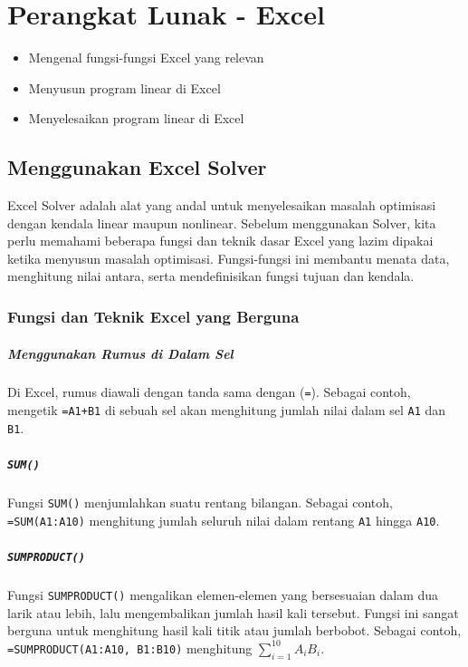 \chapter{Perangkat Lunak - Excel}

\begin{outcome}
\begin{itemize}
\item Mengenal fungsi-fungsi Excel yang relevan
\item Menyusun program linear di Excel
\item Menyelesaikan program linear di Excel
\end{itemize}
\end{outcome}

\section{Menggunakan Excel Solver}
\label{sec:excel-solver}

Excel Solver adalah alat yang andal untuk menyelesaikan masalah optimisasi dengan kendala linear maupun nonlinear. Sebelum menggunakan Solver, kita perlu memahami beberapa fungsi dan teknik dasar Excel yang lazim dipakai ketika menyusun masalah optimisasi. Fungsi-fungsi ini membantu menata data, menghitung nilai antara, serta mendefinisikan fungsi tujuan dan kendala.

\subsection{Fungsi dan Teknik Excel yang Berguna}

\paragraph{Menggunakan Rumus di Dalam Sel}
Di Excel, rumus diawali dengan tanda sama dengan (\texttt{=}). Sebagai contoh, mengetik \texttt{=A1+B1} di sebuah sel akan menghitung jumlah nilai dalam sel \texttt{A1} dan \texttt{B1}.

\paragraph{\texttt{SUM()}}
Fungsi \texttt{SUM()} menjumlahkan suatu rentang bilangan. Sebagai contoh, \texttt{=SUM(A1:A10)} menghitung jumlah seluruh nilai dalam rentang \texttt{A1} hingga \texttt{A10}.

\paragraph{\texttt{SUMPRODUCT()}}
Fungsi \texttt{SUMPRODUCT()} mengalikan elemen-elemen yang bersesuaian dalam dua larik atau lebih, lalu mengembalikan jumlah hasil kali tersebut. Fungsi ini sangat berguna untuk menghitung hasil kali titik atau jumlah berbobot. Sebagai contoh, \texttt{=SUMPRODUCT(A1:A10, B1:B10)} menghitung \( \sum_{i=1}^{10} A_i B_i \).

